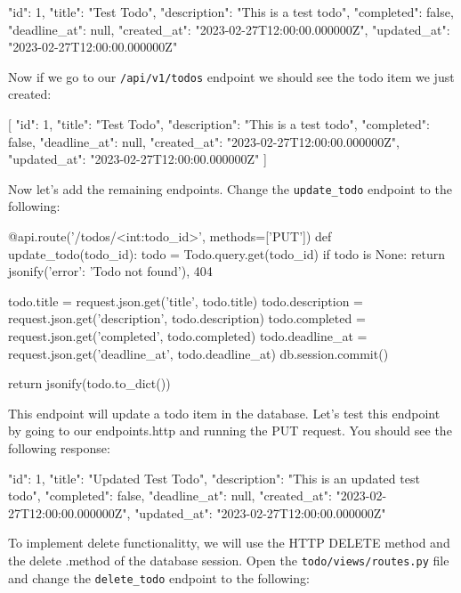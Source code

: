 \documentclass{csse4400}
\begin{document}
\begin{code}[language=json,numbers=none]{}
  {
    "id": 1,
    "title": "Test Todo",
    "description": "This is a test todo",
    "completed": false,
    "deadline_at": null,
    "created_at": "2023-02-27T12:00:00.000000Z",
    "updated_at": "2023-02-27T12:00:00.000000Z"
  }
\end{code}

Now if we go to our \texttt{/api/v1/todos} endpoint we should see the todo item we just created:

\begin{code}[language=json,numbers=none]{}
  [
    {
      "id": 1,
      "title": "Test Todo",
      "description": "This is a test todo",
      "completed": false,
      "deadline_at": null,
      "created_at": "2023-02-27T12:00:00.000000Z",
      "updated_at": "2023-02-27T12:00:00.000000Z"
    }
  ]
\end{code}

Now let's add the remaining endpoints.
Change the \texttt{update\_todo} endpoint to the following:

\begin{code}[language=python,numbers=none]{}
@api.route('/todos/<int:todo_id>', methods=['PUT'])
def update_todo(todo_id):
    todo = Todo.query.get(todo_id)
    if todo is None:
        return jsonify({'error': 'Todo not found'}), 404

    todo.title = request.json.get('title', todo.title)
    todo.description = request.json.get('description', todo.description)
    todo.completed = request.json.get('completed', todo.completed)
    todo.deadline_at = request.json.get('deadline_at', todo.deadline_at)
    db.session.commit()

    return jsonify(todo.to_dict())
\end{code}

This endpoint will update a todo item in the database.
Let's test this endpoint by going to our endpoints.http and running the PUT request.
You should see the following response:

\begin{code}[language=json,numbers=none]{}
  {
    "id": 1,
    "title": "Updated Test Todo",
    "description": "This is an updated test todo",
    "completed": false,
    "deadline_at": null,
    "created_at": "2023-02-27T12:00:00.000000Z",
    "updated_at": "2023-02-27T12:00:00.000000Z"
  }

\end{code}

To implement delete functionalitty, we will use the HTTP DELETE method and the delete .method of the database session.
Open the \texttt{todo/views/routes.py} file and change the \texttt{delete\_todo} endpoint to the following:
\end{document}
